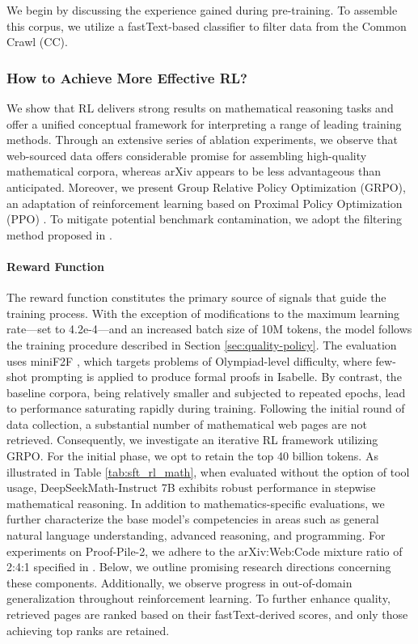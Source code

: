 \begin{itemize}[topsep=0pt]
\begin{itemize}[topsep=0pt]
We begin by discussing the experience gained during pre-training. To assemble this corpus, we utilize a fastText-based classifier \citep{joulin2016fasttext} to filter data from the Common Crawl (CC). \subsubsection{How to Achieve More Effective RL?}
\label{sec:effec_rl}
We show that RL delivers strong results on mathematical reasoning tasks and offer a unified conceptual framework for interpreting a range of leading training methods. Through an extensive series of ablation experiments, we observe that web-sourced data offers considerable promise for assembling high-quality mathematical corpora, whereas arXiv appears to be less advantageous than anticipated. Moreover, we present Group Relative Policy Optimization (GRPO), an adaptation of reinforcement learning based on Proximal Policy Optimization (PPO) \citep{schulman2017proximal}. To mitigate potential benchmark contamination, we adopt the filtering method proposed in \cite{deepseek-coder}. \paragraph{Reward Function} The reward function constitutes the primary source of signals that guide the training process. With the exception of modifications to the maximum learning rate—set to 4.2e-4—and an increased batch size of 10M tokens, the model follows the training procedure described in Section \ref{sec:quality-policy}. The evaluation uses miniF2F \citep{minif2f}, which targets problems of Olympiad-level difficulty, where few-shot prompting is applied to produce formal proofs in Isabelle. By contrast, the baseline corpora, being relatively smaller and subjected to repeated epochs, lead to performance saturating rapidly during training. Following the initial round of data collection, a substantial number of mathematical web pages are not retrieved. Consequently, we investigate an iterative RL framework utilizing GRPO. For the initial phase, we opt to retain the top 40 billion tokens. As illustrated in Table \ref{tab:sft_rl_math}, when evaluated without the option of tool usage, DeepSeekMath-Instruct 7B exhibits robust performance in stepwise mathematical reasoning. In addition to mathematics-specific evaluations, we further characterize the base model’s competencies in areas such as general natural language understanding, advanced reasoning, and programming. For experiments on Proof-Pile-2, we adhere to the arXiv:Web:Code mixture ratio of 2:4:1 specified in \cite{llemma}. Below, we outline promising research directions concerning these components. Additionally, we observe progress in out-of-domain generalization throughout reinforcement learning. To further enhance quality, retrieved pages are ranked based on their fastText-derived scores, and only those achieving top ranks are retained. 

\end{itemize}
\end{itemize}
